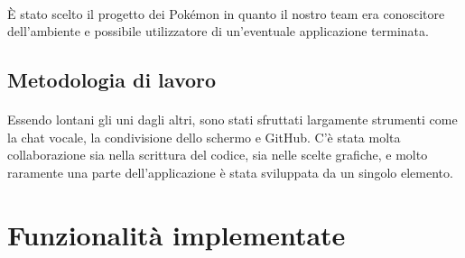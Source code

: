 \documentclass[a4paper,11pt]{article}
\begin{document}
			\paragraph{}
				È stato scelto il progetto dei Pokémon in quanto il nostro team era conoscitore dell’ambiente e possibile utilizzatore di un’eventuale applicazione terminata.
		\subsection{Metodologia di lavoro}
			\paragraph{}
				Essendo lontani gli uni dagli altri, sono stati sfruttati largamente strumenti come la chat vocale, la condivisione dello schermo e GitHub. C'è stata molta collaborazione sia nella scrittura del codice, sia nelle scelte grafiche, e molto raramente una parte dell’applicazione è stata sviluppata da un singolo elemento.\newpage
	
	\section{Funzionalità implementate}
\end{document}
